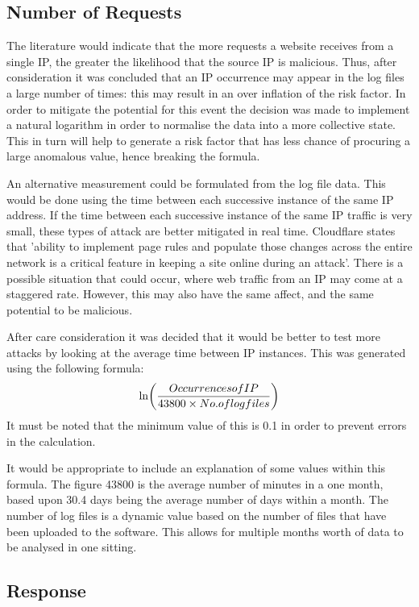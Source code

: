 \subsection{Number of Requests}
The literature would indicate that the more requests a website receives from a single IP, the greater the likelihood that the source IP is malicious. Thus, after consideration it was concluded that an IP occurrence may appear in the log files a large number of times: this may result in an over inflation of the risk factor. In order to mitigate the potential for this event the decision was made to implement a natural logarithm in order to normalise the data into a more collective state. This in turn will help to generate a risk factor that has less chance of procuring a large anomalous value, hence breaking the formula.

An alternative measurement could be formulated from the log file data. This would be done using the time between each successive instance of the same IP address. If the time between each successive instance of the same IP traffic is very small, these types of attack are better mitigated in real time. Cloudflare states that 'ability to implement page rules and populate those changes across the entire network is a critical feature in keeping a site online during an attack'. There is a possible situation that could occur, where web traffic from an IP may come at a staggered rate. However, this may also have the same affect, and the same potential to be malicious. 

After care consideration it was decided that it would be better to test more attacks by looking at the average time between IP instances. This was generated using the following formula: \[\lnb{\dfrac{Occurrences of IP }{43800 \times No. of log files}}\] It must be noted that the minimum value of this is 0.1 in order to prevent errors in the calculation. 

It would be appropriate to include an explanation of some values within this formula. The figure 43800 is the average number of minutes in a one month, based upon 30.4 days being the average number of days within a month. The number of log files is a dynamic value based on the number of files that have been uploaded to the software. This allows for multiple months worth of data to be analysed in one sitting.

\subsection{Response}


